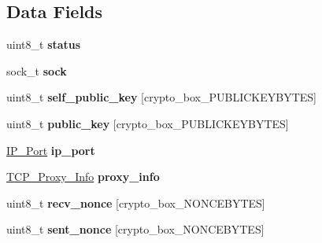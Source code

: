 \subsection*{Data Fields}
\begin{DoxyCompactItemize}
\item 
\hypertarget{struct_t_c_p___client___connection_ade818037fd6c985038ff29656089758d}{uint8\+\_\+t {\bfseries status}}\label{struct_t_c_p___client___connection_ade818037fd6c985038ff29656089758d}

\item 
\hypertarget{struct_t_c_p___client___connection_a35b19d84fb632ca8ce5cab237f7089a5}{sock\+\_\+t {\bfseries sock}}\label{struct_t_c_p___client___connection_a35b19d84fb632ca8ce5cab237f7089a5}

\item 
\hypertarget{struct_t_c_p___client___connection_ae726df8bdc26380e5a6c3187a00d6881}{uint8\+\_\+t {\bfseries self\+\_\+public\+\_\+key} \mbox{[}crypto\+\_\+box\+\_\+\+P\+U\+B\+L\+I\+C\+K\+E\+Y\+B\+Y\+T\+E\+S\mbox{]}}\label{struct_t_c_p___client___connection_ae726df8bdc26380e5a6c3187a00d6881}

\item 
\hypertarget{struct_t_c_p___client___connection_aaa806bb1136fb3d4b5d8d8970b596ff7}{uint8\+\_\+t {\bfseries public\+\_\+key} \mbox{[}crypto\+\_\+box\+\_\+\+P\+U\+B\+L\+I\+C\+K\+E\+Y\+B\+Y\+T\+E\+S\mbox{]}}\label{struct_t_c_p___client___connection_aaa806bb1136fb3d4b5d8d8970b596ff7}

\item 
\hypertarget{struct_t_c_p___client___connection_a86e2a5a56c0dd22df6e8b8a10e40f9e4}{\hyperlink{struct_i_p___port}{I\+P\+\_\+\+Port} {\bfseries ip\+\_\+port}}\label{struct_t_c_p___client___connection_a86e2a5a56c0dd22df6e8b8a10e40f9e4}

\item 
\hypertarget{struct_t_c_p___client___connection_aa737023350cf47e63993e3b4dc9a7472}{\hyperlink{struct_t_c_p___proxy___info}{T\+C\+P\+\_\+\+Proxy\+\_\+\+Info} {\bfseries proxy\+\_\+info}}\label{struct_t_c_p___client___connection_aa737023350cf47e63993e3b4dc9a7472}

\item 
\hypertarget{struct_t_c_p___client___connection_aae0467706f97aa3ef23e5dc9c3c199d7}{uint8\+\_\+t {\bfseries recv\+\_\+nonce} \mbox{[}crypto\+\_\+box\+\_\+\+N\+O\+N\+C\+E\+B\+Y\+T\+E\+S\mbox{]}}\label{struct_t_c_p___client___connection_aae0467706f97aa3ef23e5dc9c3c199d7}

\item 
\hypertarget{struct_t_c_p___client___connection_a9df0e00e8f493ed6cd1ff45e7da33c0d}{uint8\+\_\+t {\bfseries sent\+\_\+nonce} \mbox{[}crypto\+\_\+box\+\_\+\+N\+O\+N\+C\+E\+B\+Y\+T\+E\+S\mbox{]}}\label{struct_t_c_p___client___connection_a9df0e00e8f493ed6cd1ff45e7da33c0d}


\end{DoxyCompactItemize}
